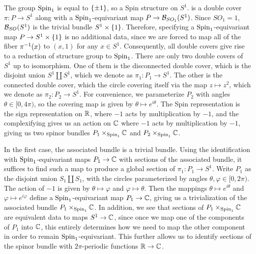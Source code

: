 \begin{exmp}
The group $\mathrm{Spin}_1$ is equal to $\left\lbrace \pm 1 \right\rbrace$, so a Spin structure on $S^1$.
is a double cover $\pi : P \to S^1$ along with a $\mathrm{Spin}_1$-equivariant
map $P \to \mathcal{B}_{SO_1}(S^1)$. Since $SO_1 = 1$, $\mathcal{B}_{SO}(S^1)$ is the trivial
bundle $S^1 \times \left\lbrace 1 \right\rbrace$. Therefore, specifying a $\mathrm{Spin}_1$-equivariant map
$P \to S^1 \times \left\lbrace 1 \right\rbrace$ is no additional data, since we are forced to map
all of the fiber $\pi^{-1}(x)$ to $(x,1)$ for any $x \in S^1$. Consequently,
all double covers give rise to a reduction of structure group to $\mathrm{Spin}_1$.
There are only two double covers of $S^1$ up to isomorphism. One of them is the disconnected
double cover, which is the disjoint union $S^1 \coprod S^1$, which we denote
as $\pi_1 : P_1 \to S^1$. The other is the connected double cover, which the
circle covering itself via the map $z \mapsto z^2$, which we denote as
$\pi_2 : P_2 \to S^1$. For convenience, we parameterize $P_2$ with angles
$\theta \in [0, 4\pi)$, so the covering map is given by $\theta \mapsto e^{i\theta}$.
The Spin representation is the sign representation on $\mathbb{R}$, where $-1$
acts by multiplication by $-1$, and the complexifying gives us an action on
$\mathbb{C}$ where $-1$ acts by multiplication by $-1$, giving us two spinor bundles
$P_1 \times_{\mathrm{Spin}_1} \mathbb{C}$ and $P_2 \times_{\mathrm{Spin}_1} \mathbb{C}$.

In the first case, the associated bundle is a trivial bundle. Using the identification
with $\mathrm{Spin}_1$-equivariant maps $P_1 \to \mathbb{C}$ with sections of the associated
bundle, it suffices to find such a map to produce a global section of
$\pi_1 : P_1 \to S^1$. Write $P_1$ as the disjoint union $S_1 \coprod S_1$,
with the circles parameterized by angles $\theta,\varphi \in [0,2\pi)$.
The action of $-1$ is given by $\theta \mapsto \varphi$ and
$\varphi \mapsto \theta$. Then the mappings $\theta \mapsto e^{i\theta}$
and $\varphi \mapsto e^{i\varphi}$ define a $\mathrm{Spin}_1$-equivariant map
$P_1 \to \mathbb{C}$, giving us a trivialization of the associated bundle
$P_1 \times_{\mathrm{Spin}_1} \mathbb{C}$. In addition, we see that sections of $P_1\times_{\mathrm{Spin}_1}\mathbb{C}$
are equivalent data to maps $S^1 \to \mathbb{C}$, since once we map one of the components
of $P_1$ into $\mathbb{C}$, this entirely determines how we need to map the other component
in order to remain $\mathrm{Spin}_1$-equivariant. This further allows us to identify
sections of the spinor bundle with $2\pi$-periodic functions $\mathbb{R} \to \mathbb{C}$.


\end{exmp}
